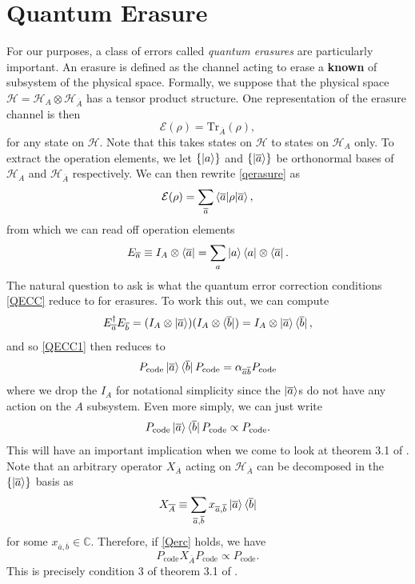 \documentclass[12pt,a4paper]{report}
\numberwithin{equation}{section}
\newcommand{\ketbra}[2]{\ket{#1}\bra{#2}}
\newcommand{\ketbras}[1]{\ketbra{#1}{#1}}
\newcommand{\Pc}{P_{\text{code}}}
\newcommand{\ol}[1]{\overline{#1}}
\theoremstyle{definition}
\theoremstyle{theorem}
\theoremstyle{theorem}
\theoremstyle{example}
\theoremstyle{definition}
\begin{document}
\section{Quantum Erasure}
For our purposes, a class of errors called \textit{quantum erasures} are particularly important. An erasure is defined as the channel acting to erase a \textbf{known} of subsystem of the physical space. Formally, we suppose that the physical space $\mathcal{H}=\mathcal{H}_{A}\otimes\mathcal{H}_{\ol{A}}$ has a tensor product structure. One representation of the erasure channel is then 
\begin{equation}\label{qerasure}
	\mathcal{E}(\rho)=\text{Tr}_{\ol{A}}(\rho),
\end{equation} 
for any state on $\mathcal{H}$. Note that this takes states on $\mathcal{H}$ to states on $\mathcal{H}_{A}$ only. To extract the operation elements, we let $\{\ket{a}\}$ and $\{\ket{\ol{a}}\}$ be orthonormal bases of $\mathcal{H}_{A}$ and $\mathcal{H}_{\ol{A}}$ respectively. We can then rewrite \ref{qerasure} as
\begin{equation}
	\mathcal{E}(\rho)=\sum_{\ol{a}}\braket{\ol{a}|\rho|\ol{a}},
\end{equation}
from which we can read off operation elements
\begin{equation}
	E_{\ol{a}}\equiv I_{A}\otimes\bra{\ol{a}}=\sum_{a}\ketbras{a}\otimes\bra{\ol{a}}.
\end{equation}
The natural question to ask is what the quantum error correction conditions \ref{QECC} reduce to for erasures. To work this out, we can compute
\begin{equation}
	E_{\ol{a}}^{\dagger}E_{\ol{b}}=(I_{A}\otimes\ket{\ol{a}})(I_{A}\otimes\bra{\ol{b}})=I_{A}\otimes\ketbra{\ol{a}}{\ol{b}},
\end{equation}
and so \ref{QECC1} then reduces to
\begin{equation}\label{Qerc}
	\Pc\ketbra{\ol{a}}{\ol{b}}\Pc=\alpha_{\ol{a}\ol{b}}\Pc
\end{equation}
where we drop the $I_{A}$ for notational simplicity since the $\ket{\ol{a}}$s do not have any action on the $A$ subsystem. Even more simply, we can just write
\begin{equation}
	\Pc\ketbra{\ol{a}}{\ol{b}}\Pc\propto\Pc.
\end{equation}
This will have an important implication when we come to look at theorem 3.1 of \cite{Harlow}. Note that an arbitrary operator $X_{\ol{A}}$ acting on $\mathcal{H}_{\ol{A}}$ can be decomposed in the $\{\ket{\ol{a}}\}$ basis as
\begin{equation}
	X_{\ol{A}}\equiv \sum_{\ol{a},\ol{b}}x_{\ol{a},\ol{b}}\ketbra{\ol{a}}{\ol{b}}
\end{equation}
for some $x_{\ol{a},\ol{b}}\in\mathbb{C}$. Therefore, if \ref{Qerc} holds, we have
\begin{equation}\label{EC}
	\Pc X_{\ol{A}}\Pc\propto\Pc.
\end{equation}
This is precisely condition 3 of theorem 3.1 of \cite{Harlow}.
\end{document}
